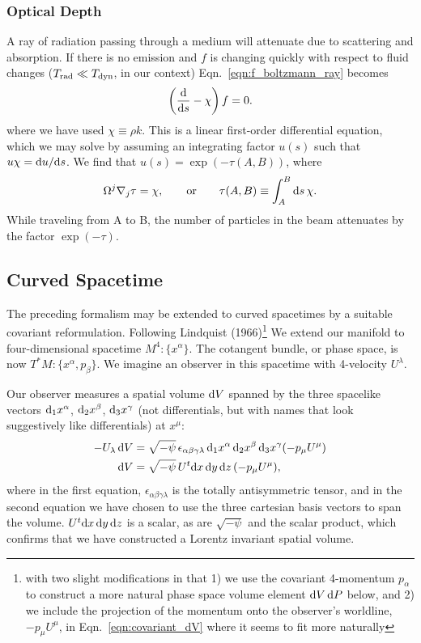 \subsubsection{Optical Depth}
A ray of radiation passing through a medium will attenuate due to scattering and
absorption. If there is no emission and $f$ is changing quickly with respect to
fluid changes ($T_{\rm rad} \ll T_{\rm dyn}$, in our context)
Eqn.~\ref{eqn:f_boltzmann_ray} becomes
\begin{equation}
  \left(\frac{\mathrm{d}}{\mathrm{d} s} - \chi\right)f=0.
\end{equation}
where we have used $\chi\equiv\rho k$.
This is a linear first-order differential equation, which we may solve by
assuming an integrating factor $u(s)$ such that $u\chi=\mathrm{d} u/\mathrm{d} s$.
We find that $u(s)=\exp\left(-\tau(A,B)\right)$, where
\begin{equation}
  \label{eqn:tau_flatspace}
  \Omega^j\nabla_j \tau = \chi, \qquad {\rm or} \qquad
  \tau(A,B) \equiv \int_A^B \mathrm{d} s\, \chi.
\end{equation}
While traveling from A to B, the number of particles in the beam attenuates by
the factor $\exp(-\tau)$.

\subsection{Curved Spacetime}
The preceding formalism may be extended to curved spacetimes by a suitable
covariant reformulation. Following Lindquist (1966)\footnote{with two slight
modifications in that 1) we use the covariant 4-momentum $p_\alpha$ to construct
a more natural phase space volume element $\mathrm{d} V\,\mathrm{d} P$ below, and 2) we
include the projection of the momentum onto the observer's worldline,
$-p_\mu U^\mu$, in Eqn.~\ref{eqn:covariant_dV} where it seems to fit more
naturally}
We extend our manifold to four-dimensional spacetime
$M^4:\{x^\alpha\}$. The cotangent bundle, or phase space, is now
$T^*M:\{x^\alpha,p_\beta\}$.
We imagine an observer in this spacetime with 4-velocity $U^\lambda$.

Our observer measures a spatial
volume $\mathrm{d} V$ spanned by the three spacelike vectors
$\mathrm{d}_1x^\alpha$, $\mathrm{d}_2x^\beta$, $\mathrm{d}_3x^\gamma$
(not differentials, but with names that look suggestively like differentials)
at $x^\mu$:
\begin{align}
  \label{eqn:covariant_dV}
  -U_\lambda\,\mathrm{d} V &= \sqrt{-\psi} \, \epsilon_{\alpha\beta\gamma\lambda}\,
  \mathrm{d}_1x^\alpha\, \mathrm{d}_2x^\beta\, \mathrm{d}_3x^\gamma (-p_\mu U^\mu) \\
  \label{eqn:dV}
  \mathrm{d} V       &= \sqrt{-\psi} \, U^t \mathrm{d} x\,\mathrm{d} y\,\mathrm{d} z\, (-p_\mu U^\mu),
\end{align}
where in the first equation, $\epsilon_{\alpha\beta\gamma\lambda}$ is the
totally antisymmetric tensor, and in the second equation we have
chosen to use the three cartesian basis vectors to span the volume.
$U^t \mathrm{d} x\,\mathrm{d} y\,\mathrm{d} z$ is a scalar,
as are $\sqrt{-\psi}$ and the scalar product, which confirms that we have
constructed a Lorentz invariant spatial volume.

